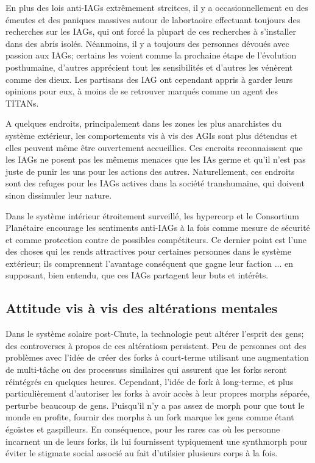 En plus des lois anti-IAGs extrêmement strcitces, il y a occasionnellement eu des émeutes et des paniques massives autour de labortaoire effectuant toujours des recherches sur les IAGs, qui ont forcé la plupart de ces recherches à s'installer dans des abris isolés. Néanmoins, il y a toujours des personnes dévoués avec passion aux IAGs; certains les voient comme la prochaine étape de l'évolution posthumaine, d'autres apprécient tout les sensibilités et d'autres les vénèrent comme des dieux. Les partisans des IAG ont cependant appris à garder leurs opinions pour eux, à moins de se retrouver marqués comme un agent des TITANs. 

A quelques endroits, principalement dans les zones les plus anarchistes du système extérieur, les comportements vis à vis des AGIs sont plus détendus et elles peuvent même être ouvertement accueillies. Ces encroits reconnaissent que les IAGs ne posent pas les mêmems menaces que les IAs germe et qu'il n'est pas juste de punir les uns pour les actions des autres. Naturellement, ces endroits sont des refuges pour les IAGs actives dans la société transhumaine, qui doivent sinon dissimuler leur nature. 

Dans le système intérieur étroitement surveillé, les hypercorp et le Consortium Planétaire encourage  les sentiments anti-IAGs à la fois comme mesure de sécurité et comme protection contre de possibles compétiteurs. Ce dernier point est l'une des choses qui les rends attractives pour certaines personnes dans le système extérieur; ils comprennent l'avantage conséquent que gagne leur faction ... en supposant, bien entendu, que ces IAGs partagent leur buts et intérêts. 

\subsection{Attitude vis à vis des altérations mentales} \label{sec:attit-towards-ment} 

Dans le système solaire post-Chute, la technologie peut altérer l'esprit des gens; des controverses à propos de ces altératiosn persistent. Peu de personnes ont des problèmes avec l'idée de créer des forks à court-terme utilisant une augmentation de multi-tâche ou des processuss similaires qui assurent que les forks seront réintégrés en quelques heures. Cependant, l'idée de fork à long-terme, et plus particulièrement d'autoriser les forks à avoir accès à leur propres morphs séparée, perturbe beaucoup de gens. Puisqu'il n'y a pas assez de morph pour que tout le monde en profite, fournir des morphs à un fork marque les gens comme étant égoïstes et gaspilleurs. En conséquence, pour les rares cas où les personne incarnent un de leurs forks, ils lui fournissent typiquement une synthmorph pour éviter le stigmate social associé au fait d'utilsier plusieurs corps à la fois. 

